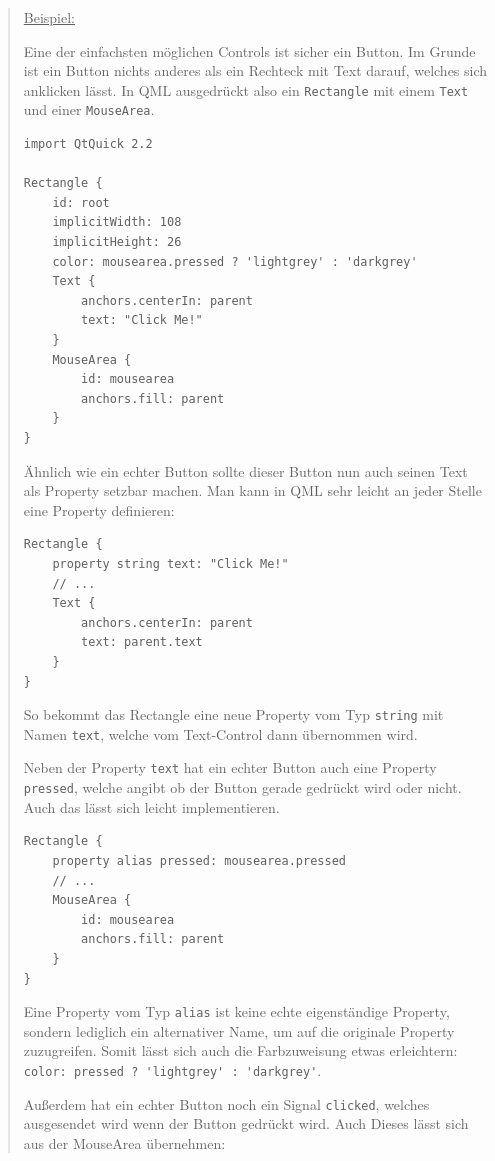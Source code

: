 \documentclass[a4paper]{article}
\begin{document}
\begin{quote}
\uline{Beispiel:}

Eine der einfachsten möglichen Controls ist sicher ein Button. Im Grunde ist ein Button nichts anderes als ein Rechteck mit Text darauf, welches sich anklicken lässt. In QML ausgedrückt also ein \verb~Rectangle~ mit einem \verb~Text~ und einer \verb~MouseArea~.

\begin{verbatim}
import QtQuick 2.2

Rectangle {
    id: root
    implicitWidth: 108
    implicitHeight: 26
    color: mousearea.pressed ? 'lightgrey' : 'darkgrey'
    Text {
        anchors.centerIn: parent
        text: "Click Me!"
    }
    MouseArea {
        id: mousearea
        anchors.fill: parent
    }
}
\end{verbatim}

Ähnlich wie ein echter Button sollte dieser Button nun auch seinen Text als Property setzbar machen. Man kann in QML sehr leicht an jeder Stelle eine Property definieren:

\begin{verbatim}
Rectangle {
    property string text: "Click Me!"
    // ...
    Text {
        anchors.centerIn: parent
        text: parent.text
    }
}
\end{verbatim}

So bekommt das Rectangle eine neue Property vom Typ \verb~string~ mit Namen \verb~text~, welche vom Text-Control dann übernommen wird.

Neben der Property \verb~text~ hat ein echter Button auch eine Property \verb~pressed~, welche angibt ob der Button gerade gedrückt wird oder nicht. Auch das lässt sich leicht implementieren.

\begin{verbatim}
Rectangle {
    property alias pressed: mousearea.pressed
    // ...
    MouseArea {
        id: mousearea
        anchors.fill: parent
    }
}
\end{verbatim}

Eine Property vom Typ \verb~alias~ ist keine echte eigenständige Property, sondern lediglich ein alternativer Name, um auf die originale Property zuzugreifen. Somit lässt sich auch die Farbzuweisung etwas erleichtern: \verb~color: pressed ? 'lightgrey' : 'darkgrey'~.

Außerdem hat ein echter Button noch ein Signal \verb~clicked~, welches ausgesendet wird wenn der Button gedrückt wird. Auch Dieses lässt sich aus der MouseArea übernehmen:


\end{quote}
\end{document}
